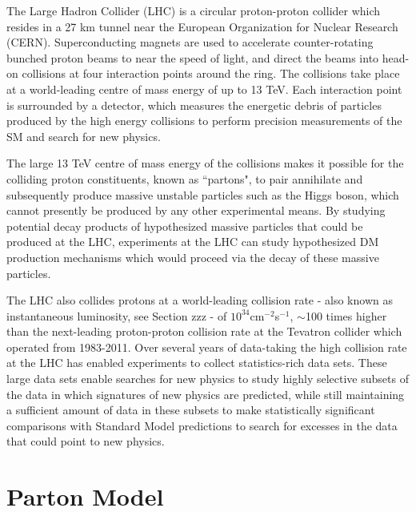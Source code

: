 \label{chapter:lhc_atlas}

The Large Hadron Collider (LHC) \cite{lhc_machine} is a circular proton-proton collider which resides in a 27 km tunnel near the European Organization for Nuclear Research (CERN). Superconducting magnets are used to accelerate counter-rotating bunched proton beams to near the speed of light, and direct the beams into head-on collisions at four interaction points around the ring. The collisions take place at a world-leading centre of mass energy of up to 13 TeV. Each interaction point is surrounded by a detector, which measures the energetic debris of particles produced by the high energy collisions to perform precision measurements of the SM and search for new physics.

The large 13 TeV centre of mass energy of the collisions makes it possible for the colliding proton constituents, known as ``partons", to pair annihilate and subsequently produce massive unstable particles such as the Higgs boson, which cannot presently be produced by any other experimental means. By studying potential decay products of hypothesized massive particles that could be produced at the LHC, experiments at the LHC can study hypothesized DM production mechanisms which would proceed via the decay of these massive particles. 

The LHC also collides protons at a world-leading collision rate - also known as instantaneous luminosity, see Section zzz - of $10^{34}$cm$^{-2}$s$^{-1}$, $\sim$100 times higher than the next-leading proton-proton collision rate at the Tevatron collider \cite{tevatron} which operated from 1983-2011. Over several years of data-taking the high collision rate at the LHC has enabled experiments to collect statistics-rich data sets. These large data sets enable searches for new physics to study highly selective subsets of the data in which signatures of new physics are predicted, while still maintaining a sufficient amount of data in these subsets to make statistically significant comparisons with Standard Model predictions to search for excesses in the data that could point to new physics.

\section{Parton Model}

